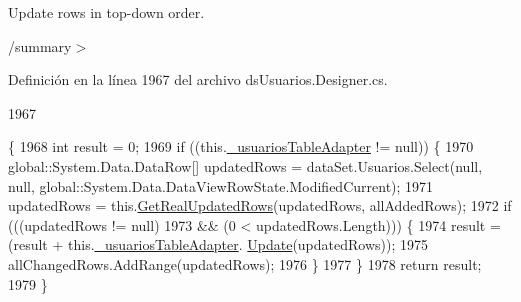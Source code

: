 Update rows in top-\/down order. 

/summary$>$ 

Definición en la línea 1967 del archivo ds\-Usuarios.\-Designer.\-cs.


\begin{DoxyCode}
1967                                                                                                            
                                                                                                                  
         \{
1968             \textcolor{keywordtype}{int} result = 0;
1969             \textcolor{keywordflow}{if} ((this.\hyperlink{class_proyecto___integrador__3_1_1ds_usuarios_table_adapters_1_1_table_adapter_manager_abe0673c88efe0b34254112af02c6501c}{\_usuariosTableAdapter} != null)) \{
1970                 global::System.Data.DataRow[] updatedRows = dataSet.Usuarios.Select(null, null, 
      global::System.Data.DataViewRowState.ModifiedCurrent);
1971                 updatedRows = this.\hyperlink{class_proyecto___integrador__3_1_1ds_usuarios_table_adapters_1_1_table_adapter_manager_afcbbeb62403513bb73fa006bf4a61f08}{GetRealUpdatedRows}(updatedRows, allAddedRows);
1972                 \textcolor{keywordflow}{if} (((updatedRows != null) 
1973                             && (0 < updatedRows.Length))) \{
1974                     result = (result + this.\hyperlink{class_proyecto___integrador__3_1_1ds_usuarios_table_adapters_1_1_table_adapter_manager_abe0673c88efe0b34254112af02c6501c}{\_usuariosTableAdapter}.
      \hyperlink{class_proyecto___integrador__3_1_1ds_usuarios_table_adapters_1_1_usuarios_table_adapter_a0cb310a6346b919a7ac5717ea3225d0b}{Update}(updatedRows));
1975                     allChangedRows.AddRange(updatedRows);
1976                 \}
1977             \}
1978             \textcolor{keywordflow}{return} result;
1979         \}
\end{DoxyCode}


